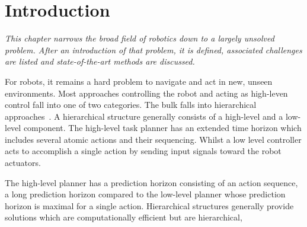 \chapter{Introduction}%
\label{chap:introduction}
\textit{This chapter narrows the broad field of robotics down to a largely unsolved problem. After an introduction of that problem, it is defined, associated challenges are listed and state-of-the-art methods are discussed.\bs}



For robots, it remains a hard problem to navigate and act in new, unseen environments. Most approaches controlling the robot and acting as high-leven control fall into one of two categories. The bulk falls into hierarchical approaches~\cite{kaelbling_hierarchical_2011,scholz_navigation_2016,krontiris_dealing_2015}. A hierarchical structure generally consists of a high-level and a low-level component. The high-level task planner has an extended time horizon which includes several atomic actions and their sequencing. Whilst a low level controller acts to accomplish a single action by sending input signals toward the robot actuators.

The high-level planner has a prediction horizon consisting of an action sequence, a long prediction horizon compared to the low-level planner whose prediction horizon is maximal for a single action. Hierarchical structures generally provide solutions which are computationally efficient but are hierarchical,

